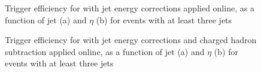 \begin{figure}[hbtp]
    \centering
{}
\hfill
{}
\caption[Trigger efficiency for \HLTThreeCentralPFJet as a function of jet \pt and $\eta$]{Trigger efficiency for
\HLTThreeCentralPFJet with jet energy corrections applied online, as a function of jet \pt (a) and $\eta$ (b) for events
with at least three jets}
\label{fig:top_hlt_pt_eta_JEC_3jets} 
\end{figure}

\begin{figure}[hbtp]
    \centering
{}
\hfill
{}
\caption[Trigger efficiency for \HLTThreeCentralPFJet as a function of jet \pt and $\eta$]{Trigger efficiency for
\HLTThreeCentralPFJet with jet energy corrections and charged hadron subtraction applied online, as a function of jet
\pt (a) and $\eta$ (b) for events with at least three jets}
\label{fig:top_hlt_pt_eta_JEC_PFnoPU_3jets} 
\end{figure}

